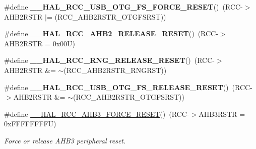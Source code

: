 \begin{DoxyCompactItemize}
\#define {\bfseries \+\_\+\+\_\+\+H\+A\+L\+\_\+\+R\+C\+C\+\_\+\+U\+S\+B\+\_\+\+O\+T\+G\+\_\+\+F\+S\+\_\+\+F\+O\+R\+C\+E\+\_\+\+R\+E\+S\+ET}()~(R\+CC-\/$>$A\+H\+B2\+R\+S\+TR $\vert$= (R\+C\+C\+\_\+\+A\+H\+B2\+R\+S\+T\+R\+\_\+\+O\+T\+G\+F\+S\+R\+ST))
\item 
\mbox{\label{group___r_c_c_ex___force___release___peripheral___reset_gae5bd400860d81b996fafa310df1f2eec}} 
\#define {\bfseries \+\_\+\+\_\+\+H\+A\+L\+\_\+\+R\+C\+C\+\_\+\+A\+H\+B2\+\_\+\+R\+E\+L\+E\+A\+S\+E\+\_\+\+R\+E\+S\+ET}()~(R\+CC-\/$>$A\+H\+B2\+R\+S\+TR = 0x00\+U)
\item 
\mbox{\label{group___r_c_c_ex___force___release___peripheral___reset_gabdd1350e70f9c77e25ea67c9929003e8}} 
\#define {\bfseries \+\_\+\+\_\+\+H\+A\+L\+\_\+\+R\+C\+C\+\_\+\+R\+N\+G\+\_\+\+R\+E\+L\+E\+A\+S\+E\+\_\+\+R\+E\+S\+ET}()~(R\+CC-\/$>$A\+H\+B2\+R\+S\+TR \&= $\sim$(R\+C\+C\+\_\+\+A\+H\+B2\+R\+S\+T\+R\+\_\+\+R\+N\+G\+R\+ST))
\item 
\mbox{\label{group___r_c_c_ex___force___release___peripheral___reset_gaa6020376afc45814f682e039aa1248e7}} 
\#define {\bfseries \+\_\+\+\_\+\+H\+A\+L\+\_\+\+R\+C\+C\+\_\+\+U\+S\+B\+\_\+\+O\+T\+G\+\_\+\+F\+S\+\_\+\+R\+E\+L\+E\+A\+S\+E\+\_\+\+R\+E\+S\+ET}()~(R\+CC-\/$>$A\+H\+B2\+R\+S\+TR \&= $\sim$(R\+C\+C\+\_\+\+A\+H\+B2\+R\+S\+T\+R\+\_\+\+O\+T\+G\+F\+S\+R\+ST))
\item 
\mbox{\label{group___r_c_c_ex___force___release___peripheral___reset_ga230a57ed6c129076b4fd17bdb07d79f6}} 
\#define \mbox{\hyperlink{group___r_c_c_ex___force___release___peripheral___reset_ga230a57ed6c129076b4fd17bdb07d79f6}{\+\_\+\+\_\+\+H\+A\+L\+\_\+\+R\+C\+C\+\_\+\+A\+H\+B3\+\_\+\+F\+O\+R\+C\+E\+\_\+\+R\+E\+S\+ET}}()~(R\+CC-\/$>$A\+H\+B3\+R\+S\+TR = 0x\+F\+F\+F\+F\+F\+F\+F\+F\+U)
\begin{DoxyCompactList}\small\item\em Force or release A\+H\+B3 peripheral reset. \end{DoxyCompactList}\item 
\mbox{\label{group___r_c_c_ex___force___release___peripheral___reset_gacc5e9454e3e387166d5caf94e91dfdf2}} 

\end{DoxyCompactItemize}
